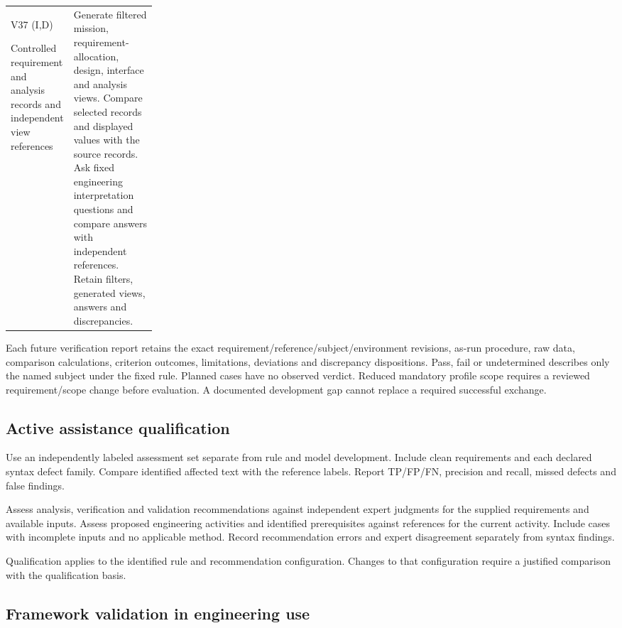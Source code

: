 {\begin{longtable}{@{}>{\raggedright\arraybackslash}p{0.24\linewidth}>{\raggedright\arraybackslash}p{}@{}}
V37 (I,D)\par Controlled requirement and analysis records and independent view references & Generate filtered mission, requirement-allocation, design, interface and analysis views. Compare selected records and displayed values with the source records. Ask fixed engineering interpretation questions and compare answers with independent references. Retain filters, generated views, answers and discrepancies. \\
\end{longtable}
}

Each future verification report retains the exact requirement/reference/subject/environment revisions, as-run procedure, raw data, comparison calculations, criterion outcomes, limitations, deviations and discrepancy dispositions. Pass, fail or undetermined describes only the named subject under the fixed rule. Planned cases have no observed verdict. Reduced mandatory profile scope requires a reviewed requirement/scope change before evaluation. A documented development gap cannot replace a required successful exchange.

\subsection{Active assistance qualification}

Use an independently labeled assessment set separate from rule and model development. Include clean requirements and each declared syntax defect family. Compare identified affected text with the reference labels. Report TP/FP/FN, precision and recall, missed defects and false findings.

Assess analysis, verification and validation recommendations against independent expert judgments for the supplied requirements and available inputs. Assess proposed engineering activities and identified prerequisites against references for the current activity. Include cases with incomplete inputs and no applicable method. Record recommendation errors and expert disagreement separately from syntax findings.

Qualification applies to the identified rule and recommendation configuration. Changes to that configuration require a justified comparison with the qualification basis.

\subsection{Framework validation in engineering use}


